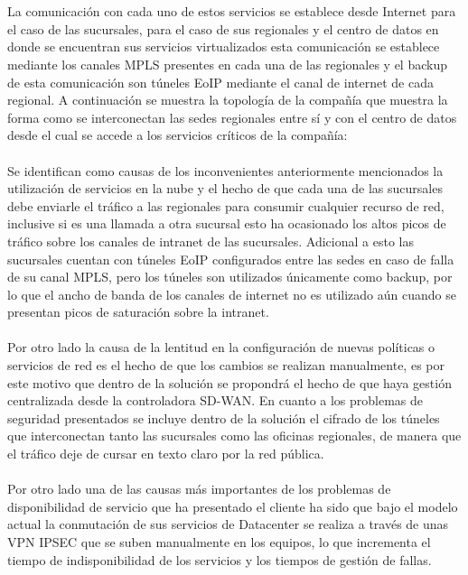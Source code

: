 \\
\\
La comunicación con cada uno de estos servicios se establece desde Internet para el caso de las sucursales, para el caso de sus regionales y el centro de datos en donde se encuentran sus servicios virtualizados esta comunicación se establece mediante los canales MPLS presentes en cada una de las regionales y el backup de esta comunicación son túneles EoIP mediante el canal de internet de cada regional. A continuación se muestra la topología de la compañía que muestra la forma como se interconectan las sedes regionales entre sí y con el centro de datos desde el cual se accede a los servicios críticos de la compañía:
\\
\\
Se identifican como causas de los inconvenientes anteriormente mencionados la utilización de servicios en la nube y el hecho de que cada una de las sucursales debe enviarle el tráfico a las regionales para consumir cualquier recurso de red, inclusive si es una llamada a otra sucursal esto ha ocasionado los altos picos de tráfico sobre los canales de intranet de las sucursales. Adicional a esto las sucursales cuentan con túneles EoIP configurados entre las sedes en caso de falla de su canal MPLS, pero los túneles son utilizados únicamente como backup, por lo que el ancho de banda de los canales de internet no es utilizado aún cuando se presentan picos de saturación sobre la intranet.
\\
\\ 
Por otro lado la causa de la lentitud en la configuración de nuevas políticas o servicios de red es el hecho de que los cambios se realizan manualmente, es por este motivo que dentro de la solución se propondrá el hecho de que haya gestión centralizada desde la controladora SD-WAN. En cuanto a los problemas de seguridad presentados se incluye dentro de la solución el cifrado de los túneles que interconectan tanto las sucursales como las oficinas regionales, de manera que el tráfico deje de cursar en texto claro por la red pública.
\\
\\
Por otro lado una de las causas más importantes de los problemas de disponibilidad de servicio que ha presentado el cliente ha sido que bajo el modelo actual la conmutación de sus servicios de Datacenter se realiza a través de unas VPN IPSEC que se suben manualmente en los equipos, lo que incrementa el tiempo de indisponibilidad de los servicios y los tiempos de gestión de fallas.
\\
\\
